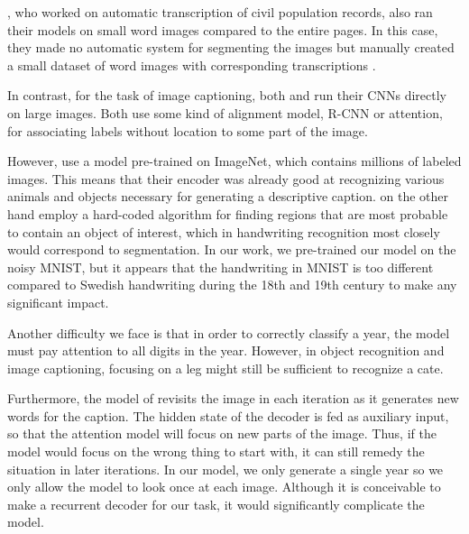 \textcite{FornesCnnCategorization}, who worked on automatic transcription of civil population records, also ran their models on small word images compared to the entire pages. In this case, they made no automatic system for segmenting the images but manually created a small dataset of word images with corresponding transcriptions \cite{esposalles}.

In contrast, for the task of image captioning, both \textcite{AttendAndTell} and \textcite{VisualSemanticAlignment} run their CNNs directly on large images. Both use some kind of alignment model, R-CNN or attention, for associating labels without location to some part of the image.

However, \textcite{AttendAndTell} use a model pre-trained on ImageNet, which contains millions of labeled images. This means that their encoder was already good at recognizing various animals and objects necessary for generating a descriptive caption. \textcite{VisualSemanticAlignment} on the other hand employ a hard-coded algorithm for finding regions that are most probable to contain an object of interest, which in handwriting recognition most closely would correspond to segmentation.
In our work, we pre-trained our model on the noisy MNIST, but it appears that the handwriting in MNIST is too different compared to Swedish handwriting during the 18th and 19th century to make any significant impact.

Another difficulty we face is that in order to correctly classify a year, the model must pay attention to all digits in the year. However, in object recognition and image captioning, focusing on a leg might still be sufficient to recognize a cate.

Furthermore, the model of \textcite{AttendAndTell} revisits the image in each iteration as it generates new words for the caption. The hidden state of the decoder is fed as auxiliary input, so that the attention model will focus on new parts of the image. Thus, if the model would focus on the wrong thing to start with, it can still remedy the situation in later iterations.
In our model, we only generate a single year so we only allow the model to look once at each image. Although it is conceivable to make a recurrent decoder for our task, it would significantly complicate the model.




